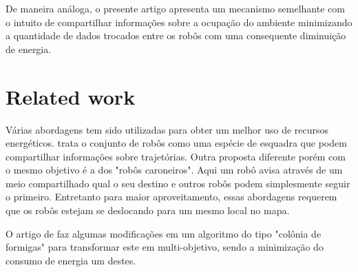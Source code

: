 \documentclass[eq,capa]{texufpel}
\begin{document}
De maneira análoga, o presente artigo apresenta um mecanismo semelhante com o intuito de compartilhar informações sobre a ocupação do ambiente minimizando a quantidade de dados trocados entre os robôs com uma consequente diminuição de energia.


\chapter{Related work}

Várias abordagens tem sido utilizadas para obter um melhor uso de recursos energéticos. \cite{2020collective} trata o conjunto de robôs como uma espécie de esquadra que podem compartilhar informações sobre trajetórias. Outra proposta diferente porém com o mesmo objetivo é a dos "robôs caroneiros"\cite{2017hitchhiking}. Aqui um robô avisa através de um meio compartilhado qual o seu destino e outros robôs podem simplesmente seguir o primeiro. Entretanto para maior aproveitamento, essas abordagens requerem que os robôs estejam se deslocando para um mesmo local no mapa.

O artigo de \cite{2021antcolony} faz algumas modificações em um algoritmo do tipo "colônia de formigas" para transformar este em multi-objetivo, sendo a minimização do consumo de energia um destes.


\end{document}
